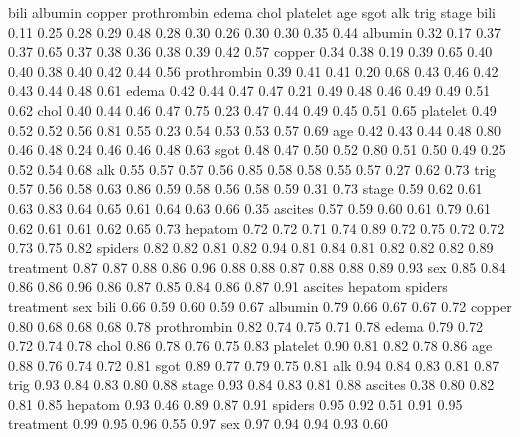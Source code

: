 \documentclass[article]{jss}
\begin{document}
\begin{Schunk}
\begin{Soutput}
            bili albumin copper prothrombin edema chol platelet  age sgot  alk trig stage
bili        0.11    0.25   0.28        0.29  0.48 0.28     0.30 0.26 0.30 0.30 0.35  0.44
albumin     0.32    0.17   0.37        0.37  0.65 0.37     0.38 0.36 0.38 0.39 0.42  0.57
copper      0.34    0.38   0.19        0.39  0.65 0.40     0.40 0.38 0.40 0.42 0.44  0.56
prothrombin 0.39    0.41   0.41        0.20  0.68 0.43     0.46 0.42 0.43 0.44 0.48  0.61
edema       0.42    0.44   0.47        0.47  0.21 0.49     0.48 0.46 0.49 0.49 0.51  0.62
chol        0.40    0.44   0.46        0.47  0.75 0.23     0.47 0.44 0.49 0.45 0.51  0.65
platelet    0.49    0.52   0.52        0.56  0.81 0.55     0.23 0.54 0.53 0.53 0.57  0.69
age         0.42    0.43   0.44        0.48  0.80 0.46     0.48 0.24 0.46 0.46 0.48  0.63
sgot        0.48    0.47   0.50        0.52  0.80 0.51     0.50 0.49 0.25 0.52 0.54  0.68
alk         0.55    0.57   0.57        0.56  0.85 0.58     0.58 0.55 0.57 0.27 0.62  0.73
trig        0.57    0.56   0.58        0.63  0.86 0.59     0.58 0.56 0.58 0.59 0.31  0.73
stage       0.59    0.62   0.61        0.63  0.83 0.64     0.65 0.61 0.64 0.63 0.66  0.35
ascites     0.57    0.59   0.60        0.61  0.79 0.61     0.62 0.61 0.61 0.62 0.65  0.73
hepatom     0.72    0.72   0.71        0.74  0.89 0.72     0.75 0.72 0.72 0.73 0.75  0.82
spiders     0.82    0.82   0.81        0.82  0.94 0.81     0.84 0.81 0.82 0.82 0.82  0.89
treatment   0.87    0.87   0.88        0.86  0.96 0.88     0.88 0.87 0.88 0.88 0.89  0.93
sex         0.85    0.84   0.86        0.86  0.96 0.86     0.87 0.85 0.84 0.86 0.87  0.91
            ascites hepatom spiders treatment  sex
bili           0.66    0.59    0.60      0.59 0.67
albumin        0.79    0.66    0.67      0.67 0.72
copper         0.80    0.68    0.68      0.68 0.78
prothrombin    0.82    0.74    0.75      0.71 0.78
edema          0.79    0.72    0.72      0.74 0.78
chol           0.86    0.78    0.76      0.75 0.83
platelet       0.90    0.81    0.82      0.78 0.86
age            0.88    0.76    0.74      0.72 0.81
sgot           0.89    0.77    0.79      0.75 0.81
alk            0.94    0.84    0.83      0.81 0.87
trig           0.93    0.84    0.83      0.80 0.88
stage          0.93    0.84    0.83      0.81 0.88
ascites        0.38    0.80    0.82      0.81 0.85
hepatom        0.93    0.46    0.89      0.87 0.91
spiders        0.95    0.92    0.51      0.91 0.95
treatment      0.99    0.95    0.96      0.55 0.97
sex            0.97    0.94    0.94      0.93 0.60
\end{Soutput}
\end{Schunk}
\end{document}
